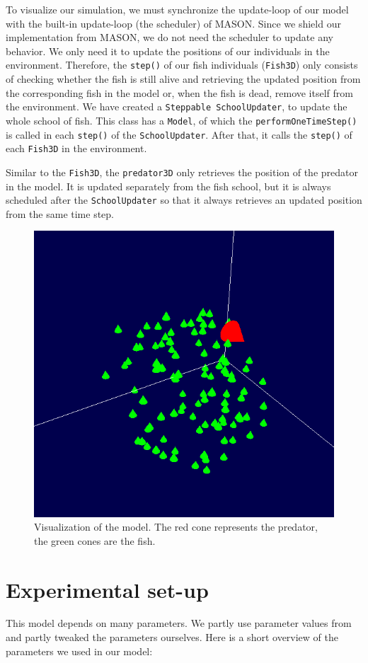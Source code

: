 \documentclass[11pt,a4paper]{article}
\begin{document}
To visualize our simulation, we must synchronize the update-loop of our model with the built-in update-loop (the scheduler) of MASON. Since we shield our implementation from MASON, we do not need the scheduler to update any behavior. We only need it to update the positions of our individuals in the environment. Therefore, the \texttt{step()} of our fish individuals (\texttt{Fish3D}) only consists of checking whether the fish is still alive and retrieving the updated position from the corresponding fish in the model or, when the fish is dead, remove itself from the environment. We have created a \texttt{Steppable SchoolUpdater}, to update the whole school of fish. This class has a \texttt{Model}, of which the \texttt{performOneTimeStep()} is called in each \texttt{step()} of the \texttt{SchoolUpdater}. After that, it calls the \texttt{step()} of each \texttt{Fish3D} in the environment.

Similar to the \texttt{Fish3D}, the \texttt{predator3D} only retrieves the position of the predator %
in the model. It is updated separately from the fish school, but it is always scheduled after the \texttt{SchoolUpdater} so that it always retrieves an updated position from the same time step.

\begin{figure}[t]
\centering
\includegraphics[width = .5\textwidth]{screenshot.png}
\caption{Visualization of the model. The red cone represents the predator, the green cones are the fish.}
\label{fig:screen}
\end{figure}


\section{Experimental set-up}
\label{sec:exp}

This model depends on many parameters. We partly use parameter values from \cite{hemelrijk} and partly tweaked the parameters ourselves. Here is a short overview of the parameters we used in our model:
\end{document}
